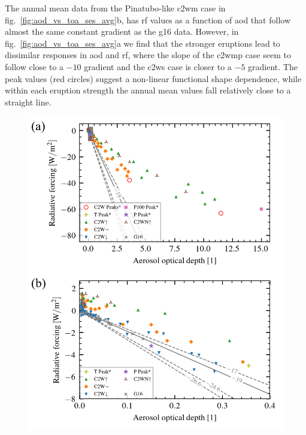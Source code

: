 \documentclass{ametsocV6.1}
\begin{document}
The annual mean data from the Pinatubo-like \gls{c2wm} case in
fig.~\ref{fig:aod_vs_toa_ses_avg}b, has \gls{rf} values as a function of \gls{aod} that
follow almost the same constant gradient as the \gls{g16} data. However, in
fig.~\ref{fig:aod_vs_toa_ses_avg}a we find that the stronger eruptions lead to
dissimilar responses in \gls{aod} and \gls{rf}, where the slope of the \gls{c2wmp} case
seem to follow close to a \(-10\) gradient and the \gls{c2ws} case is closer to a \(-5\)
gradient. The peak values (red circles) suggest a non-linear functional shape
dependence, while within each eruption strength the annual mean values fall relatively
close to a straight line.

\begin{figure}
  \centering
  \includegraphics{figures/figure2.png}


\end{figure}
\end{document}
